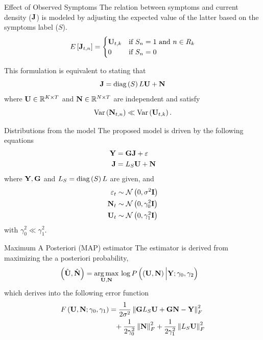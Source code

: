 \documentclass[progressbar=head]{beamer}
\begin{document}
\begin{frame}{Effect of Observed Symptoms}
The relation between symptoms and current density ($\mathbf{J}$) is modeled by adjusting the expected value of the latter based on the symptoms label ($S$).
\begin{equation}
    E\left[ \mathbf{J}_{t,n} \right] = 
    \begin{cases}
        \mathbf{U}_{t,k} & \text{if } S_n=1 \text{ and } n\in R_k \\
        0 & \text{if } S_n=0
    \end{cases}
\end{equation}

This formulation is equivalent to stating that
\begin{equation}
    \mathbf{J} = \text{diag}\left( S \right) L \mathbf{U} + \mathbf{N}
\end{equation}
where $\mathbf{U}\in \mathbb{R}^{K\times T}$ and $\mathbf{N}\in \mathbb{R}^{N\times T}$ are independent and satisfy
\begin{equation}
    \text{Var}\left( \mathbf{N}_{t,n} \right) \ll \text{Var}\left( \mathbf{U}_{t,k} \right).
\end{equation}
\end{frame}

\begin{frame}{Distributions from the model}
The proposed model is driven by the following equations
\begin{align}
    \mathbf{Y} &= \mathbf{G} \mathbf{J} + \varepsilon \\
    \mathbf{J} &=  L_S \mathbf{U} + \mathbf{N}
\end{align}
where $\mathbf{Y}, \mathbf{G}$ and $L_S = \text{diag}\left( S \right) L$ are given, and
\begin{align}
    \varepsilon_t &\sim  \mathcal{N}\left( 0, \sigma^2 \mathbf{I}  \right) \\
    \mathbf{N}_t &\sim  
    \mathcal{N}\left( 0, \gamma_0^2 \mathbf{I}  \right) \\
    \mathbf{U}_t &\sim  
    \mathcal{N}\left( 0, \gamma_1^2 \mathbf{I}  \right) 
\end{align}
with $\gamma_0^2 \ll \gamma_1^2$.
\end{frame}



\begin{frame}{Maximum A Posteriori (MAP) estimator}
The estimator is derived from maximizing the a posteriori probability,
\begin{align}
    \left(  \hat{\mathbf{U}}, \hat{\mathbf{N}}  \right) &=
    \operatorname*{arg\,max}_{\mathbf{U}, \mathbf{N} }\,
    \log P\left( \left(  {\mathbf{U}}, {\mathbf{N}}  \right) \Big| {\mathbf{Y}; \gamma_0, \gamma_2}  \right)
\end{align}
which derives into the following error function
\begin{align}
    F\left(  {\mathbf{U}}, {\mathbf{N}};  \gamma_0, \gamma_1 \right) &=
    \frac{1}{2\sigma^2}
    \left\lVert \mathbf{G} L_S \mathbf{U} + \mathbf{G} \mathbf{N} - \mathbf{Y} \right\rVert_F^2
    \nonumber \\
    &\phantom{=}
    +
    \frac{1}{2\gamma_0^2} \left\lVert \mathbf{N} \right\rVert_F^2
    +
    \frac{1}{2\gamma_1^2} \left\lVert L_S \mathbf{U} \right\rVert_F^2
\end{align}
\end{frame}
\end{document}
